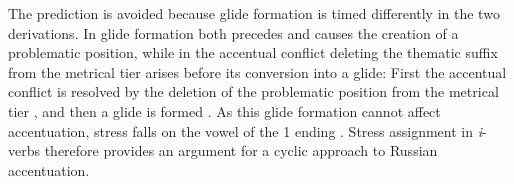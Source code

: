 \documentclass[output=paper,colorlinks,citecolor=black,koreanfont]{langscibook}
\begin{document}
\noindent The prediction is avoided because glide formation is timed differently in the two derivations. In  glide formation both precedes and causes the creation of a problematic position, while in  the accentual conflict deleting the thematic suffix from the metrical tier arises before its conversion into a glide: First the accentual conflict is resolved by the deletion of the problematic position from the metrical tier , and then a glide is formed . As this glide formation cannot affect accentuation, stress falls on the vowel of the {1\SG} ending . Stress assignment in \textit{i}-verbs therefore provides an argument for a cyclic approach to Russian accentuation.

\bigskip\bigskip\bigskip
\end{document}
